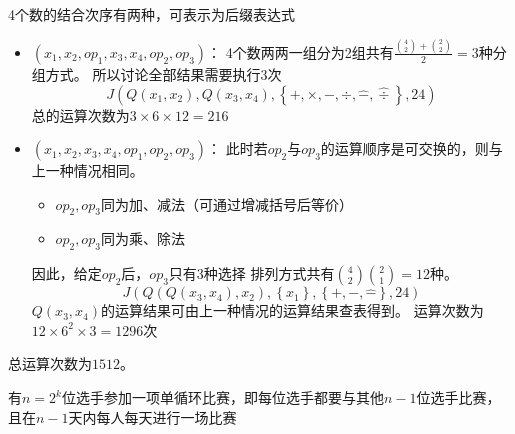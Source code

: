 \documentclass[answers]{exam}
\begin{document}
\begin{questions}
\begin{solution}
        4个数的结合次序有两种，可表示为后缀表达式
        \begin{itemize}
            \item $(x_1, x_2, op_1, x_3, x_4, op_2, op_3)$：
                  4个数两两一组分为2组共有$\frac{\binom{4}{2} + \binom{2}{2}}{2}=3$种分组方式。
                  所以讨论全部结果需要执行3次\[
                      J\left( Q(x_1,x_2), Q(x_3, x_4), \left\{+, \times, -, \div, \hat{-} , \hat{\div} \right\}, 24 \right)
                  \]
                  总的运算次数为$3 \times 6 \times 12 = 216$
            \item $(x_1, x_2, x_3, x_4, op_1, op_2, op_3)$：
                  此时若$op_2$与$op_3$的运算顺序是可交换的，则与上一种情况相同。
                  \begin{itemize}
                      \item $op_2, op_3$同为加、减法（可通过增减括号后等价）
                      \item $op_2, op_3$同为乘、除法
                  \end{itemize}
                  因此，给定$op_2$后，$op_3$只有3种选择
                  排列方式共有$\binom{4}{2}\binom{2}{1} = 12$种。
                  \[
                      J\left(Q(Q(x_3, x_4), x_2), \left\{x_1\right\}, \left\{+, -, \hat{-}\right\}, 24\right)
                  \]
                  $Q(x_3, x_4)$的运算结果可由上一种情况的运算结果查表得到。
                  运算次数为$12 \times 6^2 \times 3 = 1296$次
        \end{itemize}

        总运算次数为$1512$。
    \end{solution}

    \question 有$n=2^k$位选手参加一项单循环比赛，即每位选手都要与其他$n-1$位选手比赛，且在$n-1$天内每人每天进行一场比赛
    \begin{parts}

\end{parts}
\end{questions}
\end{document}
